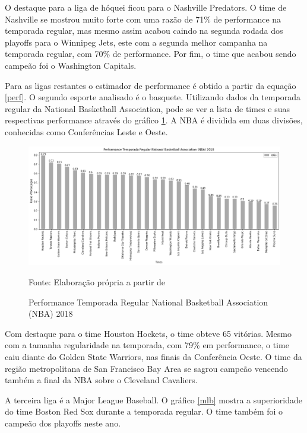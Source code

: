 \documentclass[12pt,oneside,a4paper,chapter=TITLE,english,brazil,sumario=abnt-6027-2012]{abntex2}
\begin{document}
	O destaque para a liga de hóquei ficou para o Nashville Predators. O time de Nashville se mostrou muito forte com uma razão de 71\% de performance na temporada regular, mas mesmo assim acabou caindo na segunda rodada dos playoffs para o Winnipeg Jets, este com a segunda melhor campanha na temporada regular, com 70\% de performance. Por fim, o time que acabou sendo campeão foi o Washington Capitals.
	
	Para as ligas restantes o estimador de performance é obtido a partir da equação \ref{perf}. O segundo esporte analisado é o basquete. Utilizando dados da temporada regular da National Basketball Association, pode se ver a lista de times e suas respectivas performance através do gráfico \ref{nba}. A NBA é dividida em duas divisões, conhecidas como Conferências Leste e Oeste.
	
	\begin{figure}[htbp]
		\centering
		\caption{Performance Temporada Regular National Basketball Association (NBA) 2018}
		\includegraphics[scale=0.4]{../../output/figures/nba.png}
		\label{nba}
		\\ \vspace{0.25cm}
		\raggedright
		\footnotesize{Fonte: Elaboração própria a partir de }
	\end{figure}
	
	Com destaque para o time Houston Hockets, o time obteve 65 vitórias. Mesmo com a tamanha regularidade na temporada, com 79\% em performance, o time caiu diante do Golden State Warriors, nas finais da Conferência Oeste. O time da região metropolitana de San Francisco Bay Area se sagrou campeão vencendo também a final da NBA sobre o Cleveland Cavaliers.
	
	A terceira liga é a Major League Baseball. O gráfico \ref{mlb} mostra a superioridade do time Boston Red Sox durante a temporada regular. O time também foi o campeão dos playoffs neste ano.
	
\end{document}

